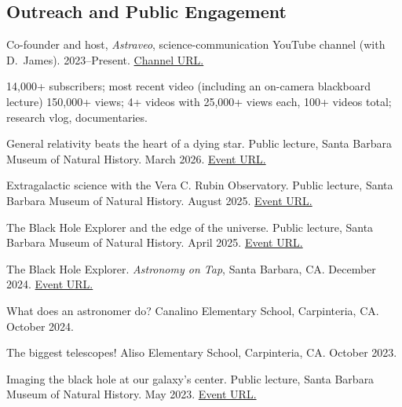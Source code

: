 \documentclass[margin,line]{res}
\begin{document}
\begin{resume}
\section{\sc Outreach and Public Engagement}

Co-founder and host, \textit{Astraveo}, science-communication YouTube channel (with D.~James). 2023--Present. {\color{blue}\href{https://www.youtube.com/@astraveo}{Channel URL.}}\par %
\vspace{-0.4cm}
{\leftskip=4mm \noindent
{\color{gray} 14,000+ subscribers; most recent video (including an on-camera blackboard lecture) 150,000+ views; 4+ videos with 25,000+ views each, 100+ videos total; research vlog, documentaries.}\par} 


General relativity beats the heart of a dying star. Public lecture, Santa Barbara Museum of Natural History. March 2026. {\color{blue}\href{https://www.sbnature.org/visit/calendar/9132/general-relativity-beats-the-heart-of-a-dying-star}{Event URL.}}

\vspace*{-2mm}
Extragalactic science with the Vera C. Rubin Observatory. Public lecture, Santa Barbara Museum of Natural History. August 2025. {\color{blue}\href{https://www.sbnature.org/visit/calendar/8760/new-frontiers-in-astronomy-powered-by-the-rubin-observatory}{Event URL.}}

\vspace*{-2mm}
The Black Hole Explorer and the edge of the universe. Public lecture, Santa Barbara Museum of Natural History. April 2025. {\color{blue}\href{https://www.sbnature.org/visit/calendar/8642/the-black-hole-explorer-and-the-edge-of-the-universe}{Event URL.}}

\vspace*{-2mm}
The Black Hole Explorer. \textit{Astronomy on Tap}, Santa Barbara, CA. December 2024. {\color{blue}\href{https://lco.global/aot/december-5-2024/}{Event URL.}}

\vspace*{-2mm}
What does an astronomer do? Canalino Elementary School, Carpinteria, CA. October 2024.


\vspace*{-2mm}
The biggest telescopes! Aliso Elementary School, Carpinteria, CA. October 2023.


\vspace*{-2mm}
Imaging the black hole at our galaxy's center. Public lecture, Santa Barbara Museum of Natural History. May 2023. {\color{blue}\href{https://www.sbnature.org/visit/calendar/7329/free-public-astronomy-talk-imaging-the-black-hole-at-our-galaxys-center}{Event URL.}}


\end{resume}
\end{document}
